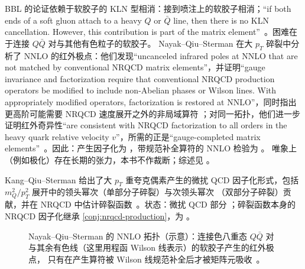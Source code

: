 BBL 的论证依赖于软胶子的 KLN 型相消：接到喷注上的软胶子相消；“if both ends of a soft gluon attach to a heavy $Q$ or $\bar Q$ line, then there is no KLN
cancellation. However, this contribution is part of the matrix element”~\cite{BodwinBraatenLepage1995}。困难在于连接 $Q\bar Q$ 对与其他有色粒子的软胶子。
Nayak--Qiu--Sterman 在大 $p_T$ 碎裂中分析了 NNLO 的红外极点：他们发现“uncanceled infrared poles at NNLO that are not matched by conventional NRQCD
matrix elements”，并证明“gauge invariance and factorization require that conventional NRQCD production operators be modified to include non-Abelian phases or
Wilson lines. With appropriately modified operators, factorization is restored at NNLO”，同时指出更高阶可能需要 NRQCD 速度展开之外的非局域算符
\cite{NayakQiuSterman2005a,NayakQiuSterman2005b}；对同一拓扑，他们进一步证明红外奇异性“are consistent with NRQCD factorization to all orders in the heavy quark
relative velocity $v$”，所需的正是“gauge-completed matrix elements”~\cite{NayakQiuSterman2006}。因此：产生因子化为 \tagC，带规范补全算符的 NNLO 检验为 \tagP。
唯象上（例如极化）存在长期的张力，本书不作裁断；综述见 \cite{BrambillaEtAl2011}。

\begin{proposition}\label{prop:quarkonium-fragmentation}
Kang--Qiu--Sterman 给出了大 $p_T$ 重夸克偶素产生的微扰 QCD 因子化形式，包括 $m_Q^2/p_T^2$ 展开中的领头幂次（单部分子碎裂）与次领头幂次
（双部分子碎裂）贡献，并在 NRQCD 中估计碎裂函数~\cite{KangQiuSterman2012}。状态：微扰 QCD 部分 \tagA；碎裂函数本身的 NRQCD 因子化继承
\cref{conj:nrqcd-production}，为 \tagC。
\end{proposition}

\begin{figure}[htbp]
\centering
{}
\caption{Nayak--Qiu--Sterman 的 NNLO 拓扑（示意）：连接色八重态 $Q\bar Q$ 对与其余有色线（这里用程函 Wilson 线表示）的软胶子产生的红外极点，
只有在产生算符被 Wilson 线规范补全后才被矩阵元吸收~\cite{NayakQiuSterman2005a,NayakQiuSterman2006}。}
\label{fig:nqs-nnlo}
\end{figure}


